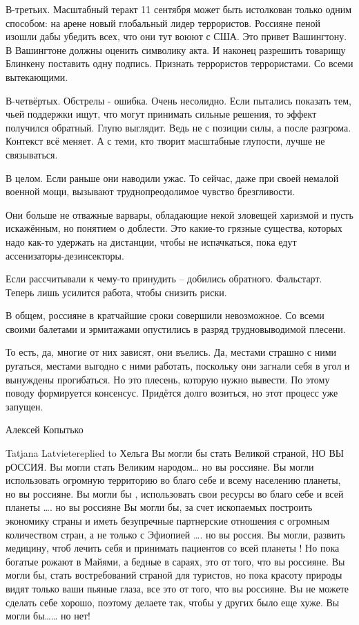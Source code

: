 В-третьих. Масштабный теракт 11 сентября может быть истолкован только одним способом: на арене новый глобальный лидер террористов. Россияне пеной изошли дабы убедить всех, что они тут воюют с США. Это привет Вашингтону. В Вашингтоне должны оценить символику акта. И наконец разрешить товарищу Блинкену поставить одну подпись. Признать террористов террористами. Со всеми вытекающими. 
 
В-четвёртых. Обстрелы - ошибка. Очень несолидно. Если пытались показать тем, чьей поддержки ищут, что могут принимать сильные решения, то эффект получился обратный. Глупо выглядит. Ведь не с позиции силы, а после разгрома. Контекст всё меняет. А с теми, кто творит масштабные глупости, лучше не связываться.

В целом. Если раньше они наводили ужас. То сейчас, даже при своей немалой военной мощи, вызывают труднопреодолимое чувство брезгливости. 
 
Они больше не отважные варвары, обладающие некой зловещей харизмой и пусть искажённым, но понятием о доблести. Это какие-то грязные существа, которых надо как-то удержать на дистанции, чтобы не испачкаться, пока едут ассенизаторы-дезинсекторы. 
 
Если рассчитывали к чему-то принудить – добились обратного. Фальстарт. Теперь лишь усилится работа, чтобы снизить риски.
 
В общем, россияне в кратчайшие сроки совершили невозможное. Со всеми своими балетами и эрмитажами опустились в разряд трудновыводимой плесени. 
 
То есть, да, многие от них зависят, они въелись. Да, местами страшно с ними ругаться, местами выгодно с ними работать, поскольку они загнали себя в угол и вынуждены прогибаться. Но это плесень, которую нужно вывести. По этому поводу формируется консенсус. Придётся долго возиться, но этот процесс уже запущен.

 Алексей Копытько


Tatjana Latvietereplied to Хельга
Вы могли бы стать Великой страной, НО ВЫ рОССИЯ.
Вы могли стать Великим народом… но вы россияне.
Вы могли использовать огромную территорию во благо себе и всему населению планеты, но вы россияне.
Вы могли бы , использовать свои ресурсы во благо себе и всей планеты …. но вы россияне
Вы могли бы, за счет ископаемых построить экономику страны и иметь безупречные партнерские отношения с огромным количеством стран, а не только с Эфиопией …. но вы россия.
Вы могли, развить медицину, чтоб лечить себя и принимать пациентов со всей планеты ! Но пока богатые рожают в Майями, а бедные в сараях, это от того, что вы россияне.
Вы могли бы, стать востребований страной для туристов, но пока красоту природы видят только ваши пьяные глаза, все это от того, что вы россияне.
Вы не можете сделать себе хорошо, поэтому делаете так, чтобы у других было еще хуже.
Вы могли бы…… но нет!


